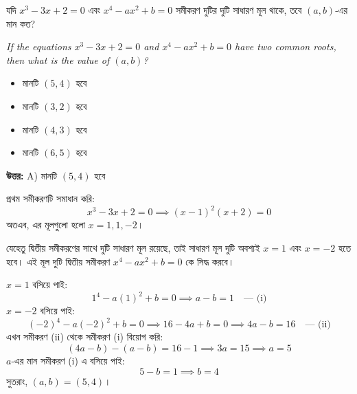 \documentclass[12pt, a4paper]{article}
\begin{document}
\vspace{1em}

\begin{tcolorbox}[questionbox={প্রশ্ন (Question) 33}]
    \noindent
    যদি $x^3 - 3x + 2 = 0$ এবং $x^4 - ax^2 + b = 0$ সমীকরণ দুটির দুটি সাধারণ মূল থাকে, তবে $(a, b)$-এর মান কত?
    
    \vspace{0.8em}
    \begin{english}
    \noindent\textit{\color{darkgray}
    If the equations $x^3 - 3x + 2 = 0$ and $x^4 - ax^2 + b = 0$ have two common roots, then what is the value of $(a, b)$?
    }
    \end{english}
\end{tcolorbox}

\begin{itemize}[label={}, leftmargin=1cm, itemsep=0.5em]
    \item[\textbf{A)}] মানটি $(5, 4)$ হবে
    \item[\textbf{B)}] মানটি $(3, 2)$ হবে
    \item[\textbf{C)}] মানটি $(4, 3)$ হবে
    \item[\textbf{D)}] মানটি $(6, 5)$ হবে
\end{itemize}

\vspace{0.5em}
\begin{tcolorbox}[answerbox]
    \textbf{\color{success} উত্তর:} A) মানটি $(5, 4)$ হবে
\end{tcolorbox}
\vspace{1em}

\begin{tcolorbox}[solutionbox={সমাধান (Solution)}]
    \noindent
    প্রথম সমীকরণটি সমাধান করি:
    \[ x^3 - 3x + 2 = 0 \implies (x-1)^2(x+2) = 0 \]
    অতএব, এর মূলগুলো হলো $x = 1, 1, -2$। 
    
    যেহেতু দ্বিতীয় সমীকরণের সাথে দুটি সাধারণ মূল রয়েছে, তাই সাধারণ মূল দুটি অবশ্যই $x = 1$ এবং $x = -2$ হতে হবে। এই মূল দুটি দ্বিতীয় সমীকরণ $x^4 - ax^2 + b = 0$ কে সিদ্ধ করবে।
    
    $x=1$ বসিয়ে পাই:
    \[ 1^4 - a(1)^2 + b = 0 \implies a - b = 1 \quad \text{--- (i)} \]
    $x=-2$ বসিয়ে পাই:
    \[ (-2)^4 - a(-2)^2 + b = 0 \implies 16 - 4a + b = 0 \implies 4a - b = 16 \quad \text{--- (ii)} \]
    এখন সমীকরণ (ii) থেকে সমীকরণ (i) বিয়োগ করি:
    \[ (4a-b) - (a-b) = 16 - 1 \implies 3a = 15 \implies a = 5 \]
    $a$-এর মান সমীকরণ (i) এ বসিয়ে পাই:
    \[ 5 - b = 1 \implies b = 4 \]
    সুতরাং, $(a, b) = (5, 4)$।
\end{tcolorbox}
\end{document}
